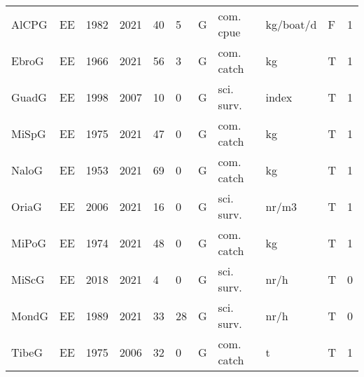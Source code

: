 \begin{table}[htbp]
\begin{tabular}{p{1cm}p{1cm}p{1cm}p{1cm}p{0.8cm}p{0.8cm}p{1cm}p{2cm}p{2cm}p{1cm}p{1cm}}
  AlCPG & EE & 1982 & 2021 & 40 & 5 & G & com. cpue & kg/boat/d & F & 1 \\ 
  EbroG & EE & 1966 & 2021 & 56 & 3 & G & com. catch & kg & T & 1 \\ 
  GuadG & EE & 1998 & 2007 & 10 & 0 & G & sci. surv. & index & T & 1 \\ 
  MiSpG & EE & 1975 & 2021 & 47 & 0 & G & com. catch & kg & T & 1 \\ 
  NaloG & EE & 1953 & 2021 & 69 & 0 & G & com. catch & kg & T & 1 \\ 
  OriaG & EE & 2006 & 2021 & 16 & 0 & G & sci. surv. & nr/m3 & T & 1 \\ 
  MiPoG & EE & 1974 & 2021 & 48 & 0 & G & com. catch & kg & T & 1 \\ 
  MiScG & EE & 2018 & 2021 & 4 & 0 & G & sci. surv. & nr/h & T & 0 \\ 
  MondG & EE & 1989 & 2021 & 33 & 28 & G & sci. surv. & nr/h & T & 0 \\ 
  TibeG & EE & 1975 & 2006 & 32 & 0 & G & com. catch & t & T & 1 \\ 
   \hline
\end{tabular}
\end{table}
